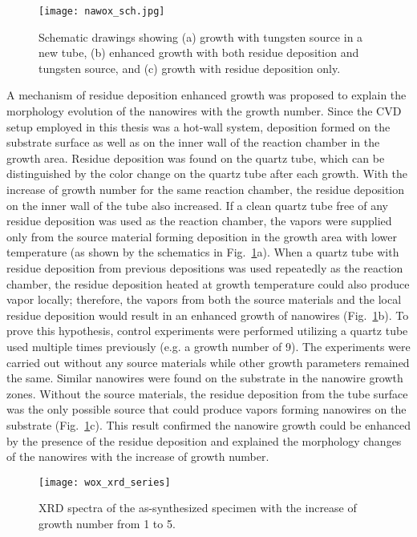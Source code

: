 \begin{figure}[htb]
\centering
\texttt{[image: nawox\_sch.jpg]}
\caption[Schematic drawings of residual sodium tungsten oxides growth]{Schematic drawings showing (a) growth with tungsten source in a new tube, (b) enhanced growth with both residue deposition and tungsten source, and (c) growth with residue deposition only.}
\label{fig:nawoxsch}
\end{figure}

A mechanism of residue deposition enhanced growth was proposed to explain the morphology evolution of the nanowires with the growth number. Since the CVD setup employed in this thesis was a hot-wall system, deposition formed on the substrate surface as well as on the inner wall of the reaction chamber in the growth area. Residue deposition was found on the quartz tube, which can be distinguished by the color change on the quartz tube after each growth. With the increase of growth number for the same reaction chamber, the residue deposition on the inner wall of the tube also increased. If a clean quartz tube free of any residue deposition was used as the reaction chamber, the vapors were supplied only from the source material forming deposition in the growth area with lower temperature (as shown by the schematics in Fig.~\ref{fig:nawoxsch}a). When a quartz tube with residue deposition from previous depositions was used repeatedly as the reaction chamber, the residue deposition heated at growth temperature could also produce vapor locally; therefore, the vapors from both the source materials and the local residue deposition would result in an enhanced growth of nanowires (Fig.~\ref{fig:nawoxsch}b). To prove this hypothesis, control experiments were performed utilizing a quartz tube used multiple times previously (e.g. a growth number of 9). The experiments were carried out without any source materials while other growth parameters remained the same. Similar nanowires were found on the substrate in the nanowire growth zones. Without the source materials, the residue deposition from the tube surface was the only possible source that could produce vapors forming nanowires on the substrate (Fig.~\ref{fig:nawoxsch}c). This result confirmed the nanowire growth could be enhanced by the presence of the residue deposition and explained the morphology changes of the nanowires with the increase of growth number.
\begin{figure}[htb]
\centering
\texttt{[image: wox\_xrd\_series]}
\caption[XRD spectra of the as-synthesized specimen]{XRD spectra of the as-synthesized specimen with the increase of growth number from 1 to 5.}
\label{fig:nawoxxrd}
\end{figure}

